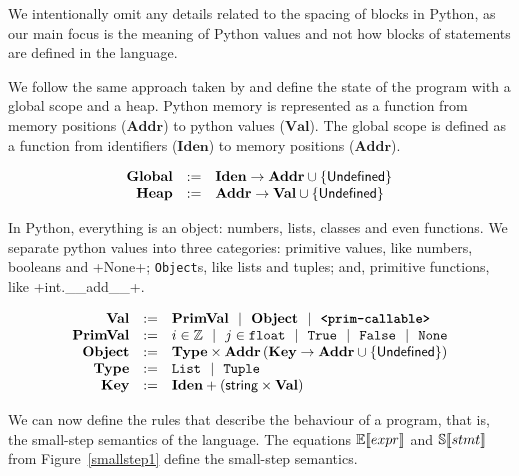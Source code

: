 We intentionally omit any details related to the spacing of blocks in Python, as our main
focus is the meaning of Python values and not how blocks of statements are defined in the
language.

We follow the same approach taken by \autocite{fromherz_static_2018} and define the state
of the program with a global scope and a heap.
Python memory is represented as a function from memory positions ($\mathbf{Addr}$) to
python values ($\mathbf{Val}$). The global scope is defined as a function from identifiers
($\mathbf{Iden}$) to memory positions ($\mathbf{Addr}$).

$$\begin{array}{rcl}
  \mathbf{Global}  &:=& \mathbf{Iden} \to \mathbf{Addr} \cup \{\mathsf{Undefined}\} \\
  \mathbf{Heap}  &:=& \mathbf{Addr} \to \mathbf{Val} \cup \{\mathsf{Undefined}\} \\
\end{array}$$

In Python, everything is an object: numbers, lists, classes and even functions. We separate
python values into three categories: primitive values, like numbers, booleans and
\pycode+None+; \verb+Object+s, like lists and tuples; and, primitive functions, like
\pycode+int.__add__+.

$$\begin{array}{rcl}
  \mathbf{Val} &:=& \mathbf{PrimVal} ~~|~~ \mathbf{Object} ~~|~~ \textbf{\texttt{<prim-callable>}} \\
  \mathbf{PrimVal} &:=& i \in \mathbb{Z} ~~|~~ j \in \texttt{float} ~~|~~ \texttt{True} ~~|~~ \texttt{False} ~~|~~ \texttt{None} \\
  \mathbf{Object} &:=& \mathbf{Type} \times \mathbf{Addr} \left(\mathbf{Key} \to \mathbf{Addr} \cup \{\mathsf{Undefined}\}\right) \\
  \mathbf{Type} &:=& \texttt{List} ~~|~~ \texttt{Tuple} \\
  \mathbf{Key} &:=& \mathbf{Iden} + \left(\textsf{string} \times \mathbf{Val}\right) \\
\end{array}$$

We can now define the rules that describe the behaviour of a program, that is, the
small-step semantics of the language. The equations $\mathbb{E}\!\left\llbracket expr \right\rrbracket$ and $\mathbb{S}\!\left\llbracket stmt \right\rrbracket$
from Figure~\ref{smallstep1} define the small-step semantics.

